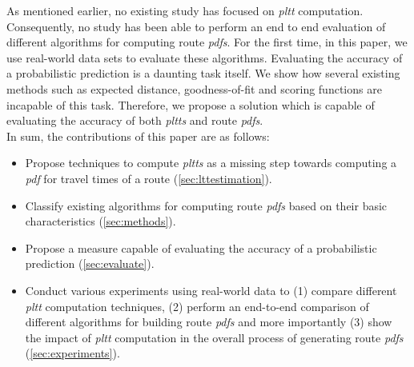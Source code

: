 As mentioned earlier, no existing study has focused on \textit{pltt} computation. Consequently, no study has been able to perform an end to end evaluation of different algorithms for computing route \textit{pdfs}. For the first time, in this paper, we use real-world data sets to evaluate these algorithms. Evaluating the accuracy of a probabilistic prediction is a daunting task itself. We show how several existing methods such as expected distance, goodness-of-fit and scoring functions are incapable of this task. Therefore, we propose a solution which is capable of evaluating the accuracy of both \textit{pltts} and route \textit{pdfs}.\\
In sum, the contributions of this paper are as follows:
\begin{itemize}
\item Propose techniques to compute \textit{pltts} as a missing step towards computing a \textit{pdf} for travel times of a route (\cref{sec:lttestimation}).
\item Classify existing algorithms for computing route \textit{pdfs} based on their basic characteristics (\cref{sec:methods}).
\item Propose a measure capable of evaluating the accuracy of a probabilistic prediction (\cref{sec:evaluate}).
\item Conduct various experiments using real-world data to (1) compare different \textit{pltt} computation techniques, (2) perform an end-to-end comparison of different algorithms for building route \textit{pdfs} and more importantly (3) show the impact of \textit{pltt} computation in the overall process of generating route \textit{pdfs} (\cref{sec:experiments}).
\end{itemize} 


